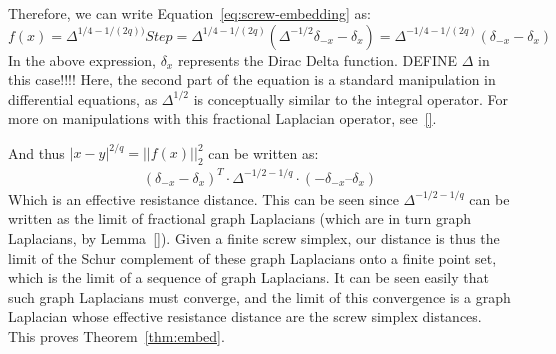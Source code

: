 Therefore, we can write Equation~\ref{eq:screw-embedding} as: \[ f(x) =
\Delta^{1/4-1/(2q))} Step = \Delta^{1/4-1/(2q)} (\Delta^{-1/2} \delta_{-x} -
\delta_{x}) = \Delta^{-1/4-1/(2q)} (\delta_{-x} - \delta_{x}) \] In the above
expression, $\delta_x$ represents the Dirac Delta function. DEFINE $\Delta$ in
this case!!!! Here, the second part of the equation is a standard manipulation
in differential equations, as $\Delta^{1/2}$ is conceptually similar to the
integral operator. For more on manipulations with this fractional Laplacian
operator, see~\ref{}.

And thus $|x-y|^{2/q} = ||f(x)||_2^2$ can be written as: \begin{align}
(\delta_{-x} - \delta_{x})^T \cdot \Delta^{-1/2-1/q} \cdot (-\delta_{-x} –
\delta_{x}) \end{align} Which is an effective resistance distance. This can be
seen since $\Delta^{-1/2-1/q}$ can be written as the limit of fractional graph
Laplacians (which are in turn graph Laplacians, by Lemma~\ref{}). Given a
finite screw simplex, our distance is thus the limit of the Schur complement of
these graph Laplacians onto a finite point set, which is the limit of a
sequence of graph Laplacians. It can be seen easily that such graph Laplacians
must converge, and the limit of this convergence is a graph Laplacian whose
effective resistance distance are the screw simplex distances. This proves
Theorem~\ref{thm:embed}. 
